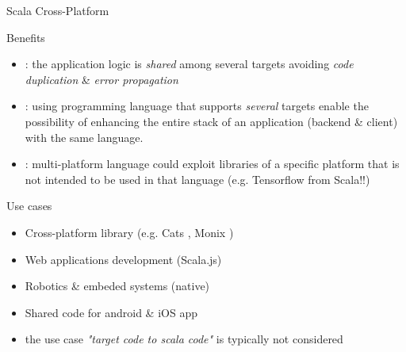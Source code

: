 \documentclass[presentation, 9pt]{beamer}\mode<presentation>{\usetheme{AMSBolognaFC}}
\begin{document}
\begin{frame}{Scala Cross-Platform}
	\begin{alertblock}{Benefits}
		\begin{itemize}
			\item {}: the application logic is \emph{shared} among several targets avoiding \emph{code duplication} \& \emph{error propagation}
			\item {}: using programming language that supports \emph{several} targets enable the possibility of enhancing the entire stack of an application (backend \& client) with the same language. 
			 \item {}: multi-platform language could exploit libraries of a specific platform that is not intended to be used in that language (e.g. Tensorflow from Scala!!)
		\end{itemize}
	\end{alertblock}
	\begin{alertblock}{Use cases}
		\begin{itemize}
			\item Cross-platform library (e.g. Cats \href{https://github.com/typelevel/cats}{\faLink}, Monix \href{https://github.com/monix/monix/}{\faLink})
   		\item Web applications development (Scala.js)
     	\item Robotics \& embeded systems (native)
      \item Shared code for android \& iOS app
      \item {} the use case \emph{"target code to scala code"} is typically not considered 
		\end{itemize}
	\end{alertblock}
\end{frame}
\end{document}
